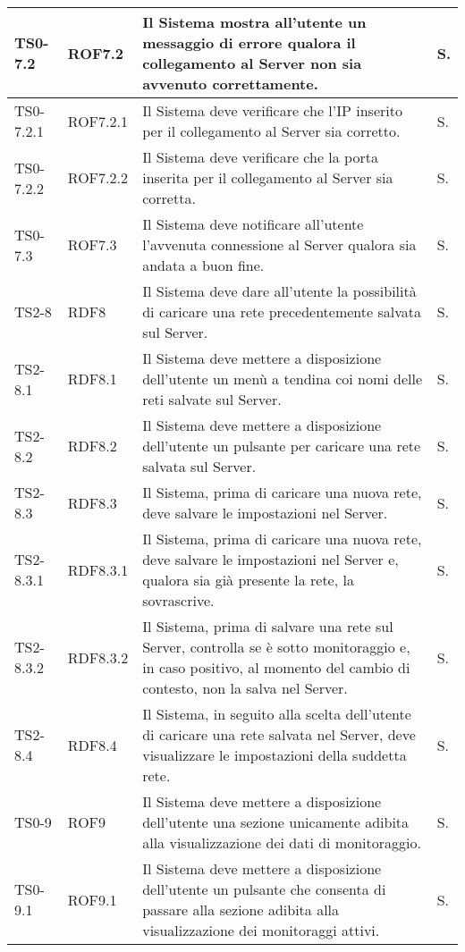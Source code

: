 \begin{longtable}{|C{.15\textwidth}|C{.14\textwidth}|m{.52\textwidth}|m{.08\textwidth}|}
\hline
{}TS0-7.2 & ROF7.2 & Il Sistema mostra all'utente un messaggio di errore qualora il collegamento al Server non sia avvenuto correttamente. & S. \\
\hline
TS0-7.2.1 & ROF7.2.1 & Il Sistema deve verificare che l'IP inserito per il collegamento al Server sia corretto. & S. \\
\hline
{}TS0-7.2.2 & ROF7.2.2 & Il Sistema deve verificare che la porta inserita per il collegamento al Server sia corretta. & S. \\
\hline
TS0-7.3 & ROF7.3 & Il Sistema deve notificare all'utente l'avvenuta connessione al Server qualora sia andata a buon fine.  & S. \\
\hline
{}TS2-8 & RDF8 & Il Sistema deve dare all'utente la possibilità di caricare una rete precedentemente salvata sul Server. & S. \\
\hline
TS2-8.1 & RDF8.1 & Il Sistema deve mettere a disposizione dell'utente un menù a tendina coi nomi delle reti salvate sul Server. & S. \\
\hline
{}TS2-8.2 & RDF8.2 & Il Sistema deve mettere a disposizione dell'utente un pulsante per caricare una rete salvata sul Server. & S. \\
\hline
TS2-8.3 & RDF8.3 & Il Sistema, prima di caricare una nuova rete, deve salvare le impostazioni nel Server. & S. \\
\hline
{}TS2-8.3.1 & RDF8.3.1 & Il Sistema, prima di caricare una nuova rete, deve salvare le impostazioni nel Server e, qualora sia già presente la rete, la sovrascrive. & S. \\
\hline
TS2-8.3.2 & RDF8.3.2 & Il Sistema, prima di salvare una rete sul Server, controlla se è sotto monitoraggio e, in caso positivo, al momento del cambio di contesto, non la salva nel Server. & S. \\
\hline
{}TS2-8.4 & RDF8.4 & Il Sistema, in seguito alla scelta dell'utente di caricare una rete salvata nel Server, deve visualizzare le impostazioni della suddetta rete. & S. \\
\hline
TS0-9 & ROF9 & Il Sistema deve mettere a disposizione dell'utente una sezione unicamente adibita alla visualizzazione dei dati di monitoraggio. & S. \\
\hline
{}TS0-9.1 & ROF9.1 & Il Sistema deve mettere a disposizione dell'utente un pulsante che consenta di passare alla sezione adibita alla visualizzazione dei monitoraggi attivi. & S. \\

\end{longtable}
